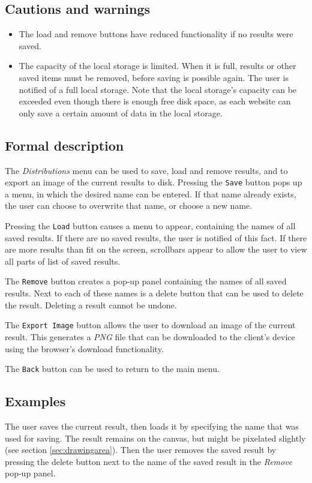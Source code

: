   \subsection*{Cautions and warnings}
  \begin{itemize}
    \item The load and remove buttons have reduced functionality if no results were saved.
    \item The capacity of the local storage is limited. When it is full, results or other saved \projectname{} items must be removed, before saving is possible again. The user is notified of a full local storage. Note that the local storage's capacity can be exceeded even though there is enough free disk space, as each website can only save a certain amount of data in the local storage.
  \end{itemize}
  
  \subsection*{Formal description}
  The \emph{Distributions} menu can be used to save, load and remove results, and to export an image of the current results to disk. Pressing the \texttt{Save} button pops up a menu, in which the desired name can be entered. If that name already exists, the user can choose to overwrite that name, or choose a new name.
  
  Pressing the \texttt{Load} button causes a menu to appear, containing the names of all saved results. If there are no saved results, the user is notified of this fact. If there are more results than fit on the screen, scrollbars appear to allow the user to view all parts of list of saved results.
  
  The \texttt{Remove} button creates a pop-up panel containing the names of all saved results. Next to each of these names is a delete button that can be used to delete the result. Deleting a result cannot be undone. 
  
  The \texttt{Export Image} button allows the user to download an image of the current result. This generates a \emph{PNG} file that can be downloaded to the client's device using the browser's download functionality.
  
  The \texttt{Back} button can be used to return to the main menu.
  
  \subsection*{Examples}
  The user saves the current result, then loads it by specifying the name that was used for saving. The result remains on the canvas, but might be pixelated slightly (see section \ref{sec:drawingarea}). Then the user removes the saved result by pressing the delete button next to the name of the saved result in the \emph{Remove} pop-up panel.

